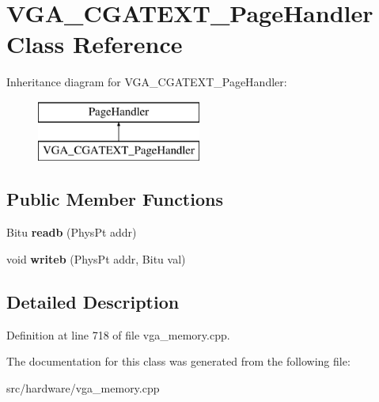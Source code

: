\hypertarget{classVGA__CGATEXT__PageHandler}{\section{V\-G\-A\-\_\-\-C\-G\-A\-T\-E\-X\-T\-\_\-\-Page\-Handler Class Reference}
\label{classVGA__CGATEXT__PageHandler}
}
Inheritance diagram for V\-G\-A\-\_\-\-C\-G\-A\-T\-E\-X\-T\-\_\-\-Page\-Handler\-:\begin{figure}[H]
\begin{center}
\leavevmode
\includegraphics[height=2.000000cm]{classVGA__CGATEXT__PageHandler}
\end{center}
\end{figure}
\subsection*{Public Member Functions}
\begin{DoxyCompactItemize}
\item 
\hypertarget{classVGA__CGATEXT__PageHandler_a37c43a069f9246f5fbc64d9328ab1d9f}{Bitu {\bfseries readb} (Phys\-Pt addr)}\label{classVGA__CGATEXT__PageHandler_a37c43a069f9246f5fbc64d9328ab1d9f}

\item 
\hypertarget{classVGA__CGATEXT__PageHandler_a3115b616f5ce1a32ff1b9b39aa6ec41a}{void {\bfseries writeb} (Phys\-Pt addr, Bitu val)}\label{classVGA__CGATEXT__PageHandler_a3115b616f5ce1a32ff1b9b39aa6ec41a}

\end{DoxyCompactItemize}


\subsection{Detailed Description}


Definition at line 718 of file vga\-\_\-memory.\-cpp.



The documentation for this class was generated from the following file\-:\begin{DoxyCompactItemize}
\item 
src/hardware/vga\-\_\-memory.\-cpp\end{DoxyCompactItemize}
